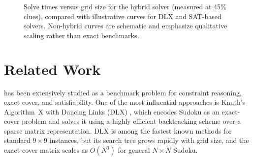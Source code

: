 \documentclass[11pt]{article}
\begin{document}
\begin{figure}[t]
\centering
{}
\caption{Solve times versus grid size for the hybrid solver (measured at 45\% clues), compared with illustrative curves for DLX and SAT-based solvers. Non-hybrid curves are schematic and emphasize qualitative scaling rather than exact benchmarks.}
\label{fig:timings-vs-families}
\end{figure}

\vspace{10pt}

\section{Related Work}

 has been extensively studied as a benchmark problem for
constraint reasoning, exact cover, and satisfiability. One of the most influential
approaches is Knuth's Algorithm~X with Dancing Links (DLX) \cite{knuth2000dlx},
which encodes Sudoku as an exact-cover problem and solves it using a highly
efficient backtracking scheme over a sparse matrix representation. DLX is among
the fastest known methods for standard $9 \times 9$ instances, but its search
tree grows rapidly with grid size, and the exact-cover matrix scales as
$O(N^3)$ for general $N \times N$ Sudoku.
\end{document}
